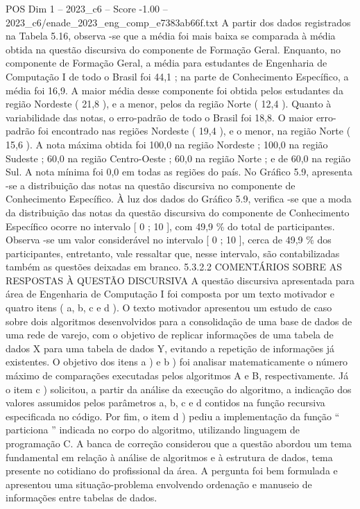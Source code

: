 \begin{textsample}{POS Dim 1 – 2023\_c6 – Score -1.00 – 2023\_c6/enade\_2023\_eng\_comp\_e7383ab66f.txt}
A partir dos dados registrados na Tabela 5.16, observa -se que a média foi mais baixa se comparada à média obtida na questão discursiva do componente de Formação Geral.
Enquanto, no componente de Formação Geral, a média para estudantes de Engenharia de Computação I de todo o Brasil foi 44,1 ; na parte de Conhecimento Específico, a média foi 16,9.
A maior média desse componente foi obtida pelos estudantes da região Nordeste ( 21,8 ), e a menor, pelos da região Norte ( 12,4 ).
Quanto à variabilidade das notas, o erro-padrão de todo o Brasil foi 18,8.
O maior erro-padrão foi encontrado nas regiões Nordeste ( 19,4 ), e o menor, na região Norte ( 15,6 ).
A nota máxima obtida foi 100,0 na região Nordeste ; 100,0 na região Sudeste ; 60,0 na região Centro-Oeste ; 60,0 na região Norte ; e de 60,0 na região Sul.
A nota mínima foi 0,0 em todas as regiões do país.
No Gráfico 5.9, apresenta -se a distribuição das notas na questão discursiva no componente de Conhecimento Específico.
À luz dos dados do Gráfico 5.9, verifica -se que a moda da distribuição das notas da questão discursiva do componente de Conhecimento Específico ocorre no intervalo [ 0 ; 10 ], com 49,9 \% do total de participantes.
Observa -se um valor considerável no intervalo [ 0 ; 10 ], cerca de 49,9 \% dos participantes, entretanto, vale ressaltar que, nesse intervalo, são contabilizadas também as questões deixadas em branco. 5.3.2.2 COMENTÁRIOS SOBRE AS RESPOSTAS À QUESTÃO DISCURSIVA A questão discursiva apresentada para área de Engenharia de Computação I foi composta por um texto motivador e quatro itens ( a, b, c e d ).
O texto motivador apresentou um estudo de caso sobre dois algoritmos desenvolvidos para a consolidação de uma base de dados de uma rede de varejo, com o objetivo de replicar informações de uma tabela de dados X para uma tabela de dados Y, evitando a repetição de informações já existentes.
O objetivo dos itens a ) e b ) foi analisar matematicamente o número máximo de comparações executadas pelos algoritmos A e B, respectivamente.
Já o item c ) solicitou, a partir da análise da execução do algoritmo, a indicação dos valores assumidos pelos parâmetros a, b, c e d contidos na função recursiva especificada no código.
Por fim, o item d ) pediu a implementação da função “ particiona ” indicada no corpo do algoritmo, utilizando linguagem de programação C.
A banca de correção considerou que a questão abordou um tema fundamental em relação à análise de algoritmos e à estrutura de dados, tema presente no cotidiano do profissional da área.
A pergunta foi bem formulada e apresentou uma situação-problema envolvendo ordenação e manuseio de informações entre tabelas de dados.

\end{textsample}
